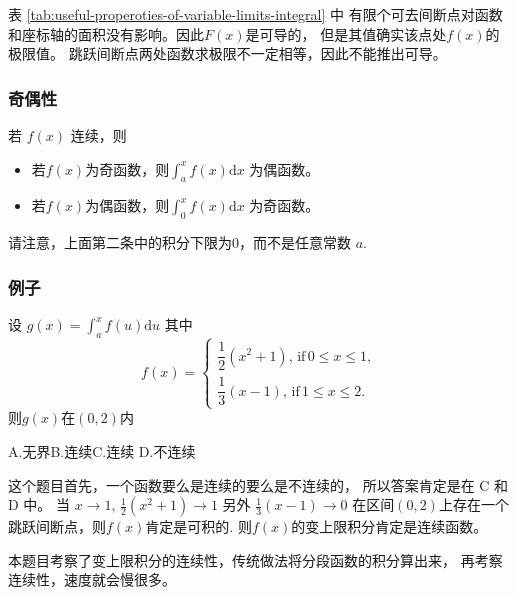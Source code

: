表 \ref{tab:useful-properoties-of-variable-limits-integral} 中
有限个可去间断点对函数和座标轴的面积没有影响。因此$F(x)$是可导的，
但是其值确实该点处$f(x)$的极限值。
跳跃间断点两处函数求极限不一定相等，因此不能推出可导。

\subsubsection{奇偶性}

若 $f(x)$ 连续，则
\begin{itemize}
    \item 若$f(x)$为奇函数，则$\int_a^x f(x) \mathrm{d}x$ 为偶函数。
    \item 若$f(x)$为偶函数，则$\int_0^x f(x) \mathrm{d}x$ 为奇函数。
\end{itemize}
请注意，上面第二条中的积分下限为$0$，而不是任意常数 $a$.

\subsubsection{例子}

\begin{example}
    设 $g(x) = \int_a^x f(u) \mathrm{d} u$ 其中
    \[
        f(x) = \left\{
            \begin{array}{rl}
                \dfrac{1}{2} (x^2+1),\, \mbox{if}\, 0 \leq x \leq 1, \\[1em]
                \dfrac{1}{3} (x-1),  \, \mbox{if}\, 1 \leq x \leq 2.
            \end{array}
        \right.
    \]
    则$g(x)$在$(0, 2)$内

    A.无界\quad B.连续\quad C.连续 \quad D.不连续

    这个题目首先，一个函数要么是连续的要么是不连续的，
    所以答案肯定是在 C 和 D 中。
    当 $x \to 1$, $\frac{1}{2} (x^2 + 1) \to 1$ 
    另外 $\frac{1}{3} (x - 1) \to 0$
    在区间$(0,2)$上存在一个跳跃间断点，则$f(x)$肯定是可积的.
    则$f(x)$的变上限积分肯定是连续函数。

    本题目考察了变上限积分的连续性，传统做法将分段函数的积分算出来，
    再考察连续性，速度就会慢很多。
\end{example}

